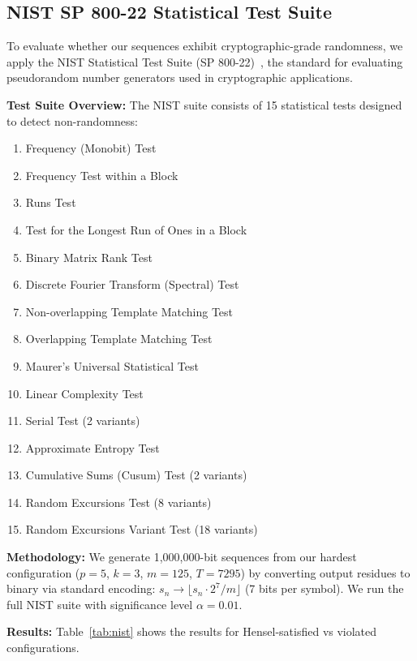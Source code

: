 \documentclass[11pt]{article}
\theoremstyle{plain}
\theoremstyle{definition}
\begin{document}
\subsection{NIST SP 800-22 Statistical Test Suite}

To evaluate whether our sequences exhibit cryptographic-grade randomness, we apply the NIST Statistical Test Suite (SP 800-22)~\citep{NIST2010}, the standard for evaluating pseudorandom number generators used in cryptographic applications.

\textbf{Test Suite Overview:} The NIST suite consists of 15 statistical tests designed to detect non-randomness:
\begin{enumerate}[leftmargin=2em,itemsep=1pt]
\item Frequency (Monobit) Test
\item Frequency Test within a Block
\item Runs Test
\item Test for the Longest Run of Ones in a Block
\item Binary Matrix Rank Test
\item Discrete Fourier Transform (Spectral) Test
\item Non-overlapping Template Matching Test
\item Overlapping Template Matching Test
\item Maurer's Universal Statistical Test
\item Linear Complexity Test
\item Serial Test (2 variants)
\item Approximate Entropy Test
\item Cumulative Sums (Cusum) Test (2 variants)
\item Random Excursions Test (8 variants)
\item Random Excursions Variant Test (18 variants)
\end{enumerate}

\textbf{Methodology:} We generate 1,000,000-bit sequences from our hardest configuration ($p=5$, $k=3$, $m=125$, $T=7295$) by converting output residues to binary via standard encoding: $s_n \to \lfloor s_n \cdot 2^7 / m \rfloor$ (7 bits per symbol). We run the full NIST suite with significance level $\alpha = 0.01$.

\textbf{Results:} Table~\ref{tab:nist} shows the results for Hensel-satisfied vs violated configurations.
\end{document}
